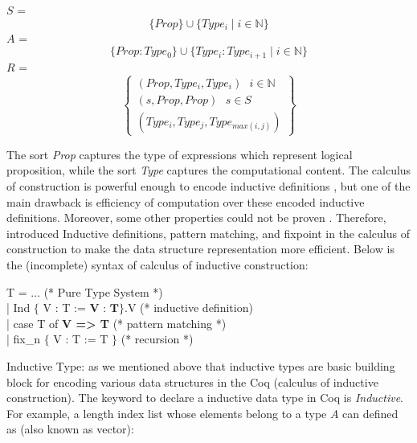 \begin{displayquote}

    $S$ = \[ \lbrace  Prop \rbrace \cup \lbrace  Type_{i} \mid  i \in \mathbb{N} \rbrace \]
    $A$ =  \[ \lbrace Prop : Type_{0} \rbrace \cup \lbrace Type_{i} : Type_{i+1} \mid i \in \mathbb{N} \rbrace \]
    $R$ = 
     \[
   \left\{ \begin{array}{l}
   (Prop, Type_{i}, Type_{i}) \text{      } i \in \mathbb{N}  \\
   (s, Prop, Prop)  \text{     } s \in S \\
   (Type_{i}, Type_{j}, Type_{max (i, j)}) 
  \end{array}\right\}
\]
       
\end{displayquote}

\noindent
The sort \textit{Prop} captures the type of expressions which represent logical proposition, while 
the sort \textit{Type} captures the computational content.   The calculus of construction is
 powerful enough to encode inductive definitions \citep{pfenning1989inductively}, but 
 one of the main drawback is efficiency of computation over these encoded 
 inductive definitions.  Moreover, some other properties could not be proven \citep{10.1007/3-540-45413-6_16}.
Therefore, \citep{Paulin-Mohring:1993:IDS:645891.671440}  introduced 
Inductive definitions, pattern matching, and fixpoint in the calculus of construction to make the data structure 
representation more efficient.  Below is the  (incomplete) syntax of calculus of inductive construction:

 \begin{displayquote}

    T = ...  (*  Pure Type System *) \\
       | Ind $\lbrace$ V : T :=  $\textbf{V : T} \rbrace$.V (* inductive definition) \\
       | case T of \textbf{V => T} (* pattern matching *)  \\
       | fix_{n}  $\lbrace$ V : T := T $\rbrace$ (* recursion *) \\
   \end{displayquote}
 

\noindent 
Inductive Type: as we mentioned above that inductive types are basic building block for encoding various 
data structures in the Coq (calculus of inductive construction). The keyword to declare a inductive data type in Coq is 
\textit{Inductive}. For example, a length index list
whose elements belong to a type $A$ can defined as (also known as vector):

